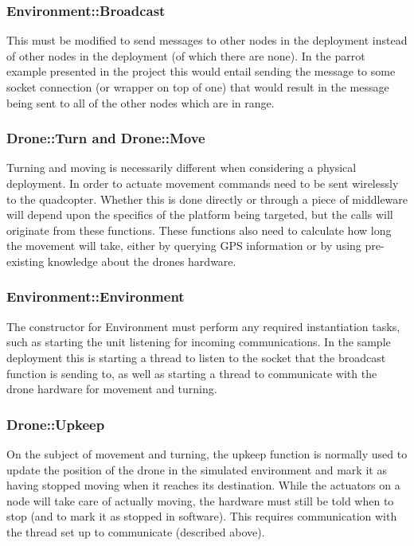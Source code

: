 \subsubsection{Environment::Broadcast}
This must be modified to send messages to other nodes in the deployment instead of other nodes in the deployment (of which there are none). In the parrot example presented in the project this would entail sending the message to some socket connection (or wrapper on top of one) that would result in the message being sent to all of the other nodes which are in range.

\subsubsection{Drone::Turn and Drone::Move}
Turning and moving is necessarily different when considering a physical deployment. In order to actuate movement commands need to be sent wirelessly to the quadcopter. Whether this is done directly or through a piece of middleware will depend upon the specifics of the platform being targeted, but the calls will originate from these functions. These functions also need to calculate how long the movement will take, either by querying GPS information or by using pre-existing knowledge about the drones hardware.

\subsubsection{Environment::Environment}
The constructor for Environment must perform any required instantiation tasks, such as starting the unit listening for incoming communications. In the sample deployment this is starting a thread to listen to the socket that the broadcast function is sending to, as well as starting a thread to communicate with the drone hardware for movement and turning.

\subsubsection{Drone::Upkeep}
On the subject of movement and turning, the upkeep function is normally used to update the position of the drone in the simulated environment and mark it as having stopped moving when it reaches its destination. While the actuators on a node will take care of actually moving, the hardware must still be told when to stop (and to mark it as stopped in software). This requires communication with the thread set up to communicate (described above).

